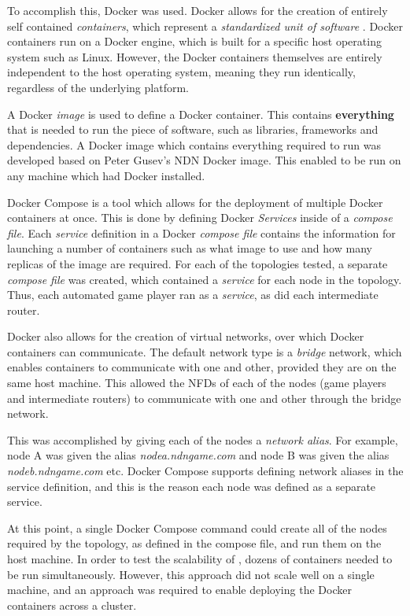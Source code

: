 To accomplish this, Docker was used. Docker allows for the creation of entirely self contained \textit{containers}, which represent a \textit{standardized unit of software} \cite{docker}. Docker containers run on a Docker engine, which is built for a specific host operating system such as Linux. However, the Docker containers themselves are entirely independent to the host operating system, meaning they run identically, regardless of the underlying platform.

A Docker \textit{image} is used to define a Docker container. This contains \textbf{everything} that is needed to run the piece of software, such as libraries, frameworks and dependencies. A Docker image which contains everything required to run \game{} was developed based on Peter Gusev's \cite{docker-ndn} NDN Docker image. This enabled \game{} to be run on any machine which had Docker installed.

Docker Compose \cite{docker-compose} is a tool which allows for the deployment of multiple Docker containers at once. This is done by defining Docker \textit{Services} inside of a \textit{compose file}. Each \textit{service} definition in a Docker \textit{compose file} contains the information for launching a number of containers such as what image to use and how many replicas of the image are required. For each of the topologies tested, a separate \textit{compose file} was created, which contained a \textit{service} for each node in the topology. Thus, each automated game player ran as a \textit{service}, as did each intermediate router.

Docker also allows for the creation of virtual networks, over which Docker containers can communicate. The default network type is a \textit{bridge} network, which enables containers to communicate with one and other, provided they are on the same host machine. This allowed the NFDs of each of the nodes (game players and intermediate routers) to communicate with one and other through the bridge network. 

This was accomplished by giving each of the nodes a \textit{network alias}. For example, node A was given the alias \textit{nodea.ndngame.com} and node B was given the alias \textit{nodeb.ndngame.com} etc. Docker Compose supports defining network aliases in the service definition, and this is the reason each node was defined as a separate service.

At this point, a single Docker Compose command could create all of the \game{} nodes required by the topology, as defined in the compose file, and run them on the host machine. In order to test the scalability of \game{}, dozens of containers needed to be run simultaneously. However, this approach did not scale well on a single machine, and an approach was required to enable deploying the Docker containers across a cluster.

